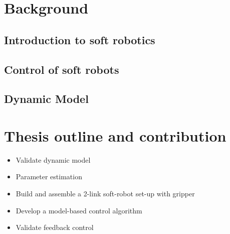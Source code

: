 

\section{Background}


\subsection{Introduction to soft robotics}


\subsection{Control of soft robots}




\subsection{Dynamic Model}



\section{Thesis outline and contribution}




\begin{itemize}
    \item Validate dynamic model
    \item Parameter estimation
    \item Build and assemble a 2-link soft-robot set-up with gripper
    \item Develop a model-based control algorithm
    \item Validate feedback control
\end{itemize}